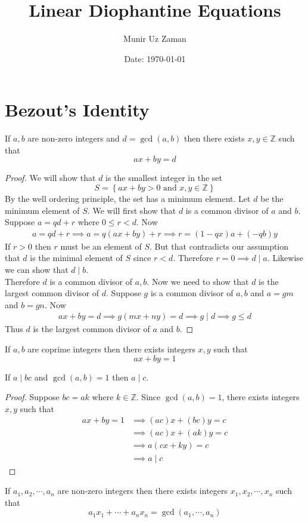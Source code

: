 \documentclass[11pt,numbers=noenddot,svgnames,dvipsnames]{scrartcl}
\title{Linear Diophantine Equations}
\author{Munir Uz Zaman}
\date{Date: \today}
\begin{document}
\maketitle

\section{Bezout's Identity}

\begin{theorem}
    If $a,b$ are non-zero integers and $d = \gcd(a, b)$ then there exists $x, y \in \mathbb{Z}$ such that 
    \[
        ax + by = d
    \]
\end{theorem}
\begin{proof}
    We will show that $d$ is the smallest integer in the set 
    \[
        S = \left\{ax + by > 0 \text{ and } x, y \in \mathbb{Z}\right\}
    \]
    By the well ordering principle, the set has a minimum element. Let $d$ be the minimum element of $S$. 
    We will first show that $d$ is a common divisor of $a$ and $b$. \\
    Suppose $a = qd + r$ where $0 \leq r < d$. Now 
    \begin{align*}
        a = qd + r \implies a = q(ax + by) + r \implies r = (1 - qx)a + (-qb)y
    \end{align*}
    If $r > 0$ then $r$ must be an element of $S$. But that contradicts our assumption that $d$ is the minimal element 
    of $S$ since $r < d$. Therefore $r = 0 \implies d \mid a$. Likewise we can show that $d \mid b$. \\
    Therefore $d$ is a common divisor of $a,b$. Now we need to show that $d$ is the largest common divisor of $d$. 
    Suppose $g$ is a common divisor of $a,b$ and $a = gm$ and $b = gn$. Now 
    \begin{align*}
        ax+ by = d \implies g(mx + ny) = d \implies g \mid d \implies g \leq d
    \end{align*}
    Thus $d$ is the largest common divisor of $a$ and $b$.
\end{proof}

\begin{corollary}
    If $a,b$ are coprime integers then there exists integers $x, y$ such that 
    \[
        ax + by = 1
    \]
\end{corollary}

\begin{theorem}
    If $a \mid bc$ and $\gcd(a, b) = 1$ then $a \mid c$.
\end{theorem}
\begin{proof}
    Suppose $bc = ak$ where $k \in \mathbb{Z}$. 
    Since $\gcd(a, b) = 1$, there exists integers $x, y$ such that 
    \begin{align*}
        ax + by = 1 &\implies (ac)x + (bc)y = c \\
                    &\implies (ac)x + (ak)y = c \\
                    &\implies a(cx + ky) = c \\
                    &\implies a \mid c
    \end{align*}
\end{proof}

\begin{theorem}
    If $a_{1}, a_{2}, \cdots, a_{n}$ are non-zero integers then there exists integers 
    $x_{1}, x_{2}, \cdots, x_{n}$ such that 
    \[
        a_{1}x_{1} + \cdots + a_{n}x_{n} = \gcd(a_{1}, \cdots, a_{n})
    \]
\end{theorem}
\end{document}

